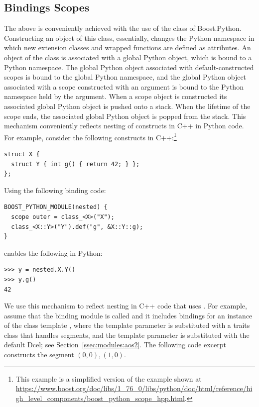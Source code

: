 \subsection{Bindings Scopes}
\label{sec:gen:scopes}
The above is conveniently achieved with the use of the
 class of Boost.Python. Constructing an object
of this class, essentially, changes the Python namespace in which new
extension classes and wrapped functions are defined as attributes.  An
object of the  class is associated with a
global Python object, which is bound to a Python namespace. The global
Python object associated with default-constructed scopes is bound to
the global Python namespace, and the global Python object associated
with a scope constructed with an argument is bound to the Python
namespace held by the argument. When a scope object is constructed its
associated global Python object is pushed onto a stack. When the
lifetime of the scope ends, the associated global Python object is
popped from the stack. This mechanism conveniently reflects nesting of
constructs in C++ in Python code. For example, consider the following
constructs in C++:\footnote{This example is a simplified version of
  the example shown at
  \url{https://www.boost.org/doc/libs/1_76_0/libs/python/doc/html/reference/high_level_components/boost_python_scope_hpp.html}.}

\begin{lstlisting}[style=cppNumberedStyle]
struct X {
  struct Y { int g() { return 42; } };
};
\end{lstlisting}

\noindent
Using the following binding code:

\begin{lstlisting}[style=cppNumberedStyle]
BOOST_PYTHON_MODULE(nested) {
  scope outer = class_<X>("X");
  class_<X::Y>("Y").def("g", &X::Y::g);
}
\end{lstlisting}

\noindent
enables the following in Python:

\begin{lstlisting}[style=pythonStyle]
>>> y = nested.X.Y()
>>> y.g()
42
\end{lstlisting}

\noindent
We use this mechanism to reflect nesting in C++ code that uses
\cgal. For example, assume that the binding module is called 
 and it includes bindings for an instance of the class 
template , where the
 template parameter is substituted with a
traits class that handles segments, and the 
template parameter is substituted with the default Dcel; see
Section~\ref{ssec:modules:aos2}. The following code excerpt constructs
the segment $(0,0),(1,0)$.

